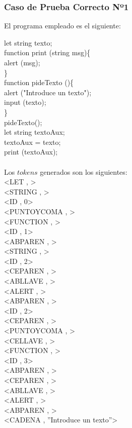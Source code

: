\documentclass{article}
\begin{document}
\subsubsection{Caso de Prueba Correcto Nº1}
\begin{center} 
El programa empleado es el siguiente:
\end{center}
\begin{flushleft}
let string texto;\\
function print (string msg)\{ \\
\qquad	alert (msg);\\
\} \\
function pideTexto ()\{ \\
\qquad	alert ("Introduce un texto");\\
\qquad	input (texto);\\
\}\\
pideTexto();\\
let string textoAux;\\
textoAux = texto;\\
print (textoAux);\\
\quad\\
Los $tokens$ generados son los siguientes:\\
<LET , >\\
<STRING , >\\
<ID , 0>\\
<PUNTOYCOMA , >\\
<FUNCTION , >\\
<ID , 1>\\
<ABPAREN , >\\
<STRING , >\\
<ID , 2>\\
<CEPAREN , >\\
<ABLLAVE , >\\
<ALERT , >\\
<ABPAREN , >\\
<ID , 2>\\
<CEPAREN , >\\
<PUNTOYCOMA , >\\
<CELLAVE , >\\
<FUNCTION , >\\
<ID , 3>\\
<ABPAREN , >\\
<CEPAREN , >\\
<ABLLAVE , >\\
<ALERT , >\\
<ABPAREN , >\\
<CADENA , ''Introduce un texto''>\\

\end{flushleft}
\end{document}
